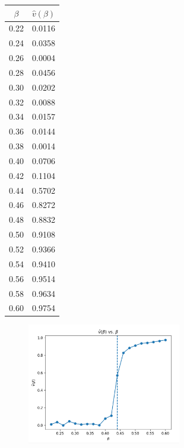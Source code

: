 \documentclass[11pt,letterpaper, leqno]{article}
\numberwithin{equation}{section}
\numberwithin{theorem}{section}
\numberwithin{lemma}{section}
\numberwithin{corollary}{section}
\numberwithin{definition}{section}
\numberwithin{proposition}{section}
\numberwithin{remark}{section}
\numberwithin{example}{section}
\renewcommand{\hat}[1]{\widehat{#1}}
\begin{document}
        \begin{tabular*}{1in}{|c|c|} 
            \hline 
            $\beta$ & $\hat{v}(\beta)$\\ 
            \hline 
            0.22 & 0.0116\\ 
            0.24 & 0.0358\\
            0.26 & 0.0004\\ 
            0.28 & 0.0456\\ 
            0.30 & 0.0202\\ 
            0.32 & 0.0088\\ 
            0.34 & 0.0157\\ 
            0.36 & 0.0144\\ 
            0.38 & 0.0014\\ 
            0.40 & 0.0706\\ 
            0.42 & 0.1104\\ 
            0.44 & 0.5702\\ 
            0.46 & 0.8272\\ 
            0.48 & 0.8832\\ 
            0.50 & 0.9108\\ 
            0.52 & 0.9366\\ 
            0.54 & 0.9410\\ 
            0.56 & 0.9514\\ 
            0.58 & 0.9634\\ 
            0.60 & 0.9754\\ 
            \hline 
        \end{tabular*}
        \vspace*{-4in}
        \begin{figure}
            \centering
            \includegraphics[width=0.6\textwidth]{Images/Estimator v Beta.png}
        \end{figure}
      
\end{document}
